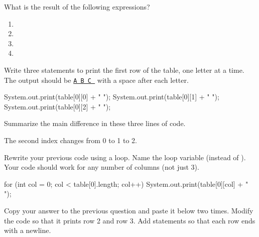 \newpage

\Q What is the result of the following expressions?

\begin{multicols}{2}
\begin{enumerate}
\item {} 
\item {} 
\item {} 
\item {} 
\end{enumerate}
\end{multicols}


\vspace{1em}


\Q Write three statements to print the first row of the table, one letter at a time.
The output should be \underline{\texttt{A~B~C~}} with a space after each letter.

\begin{answer}[5em]
\begin{javaans}
System.out.print(table[0][0] + " ");
System.out.print(table[0][1] + " ");
System.out.print(table[0][2] + " ");
\end{javaans}
\end{answer}


\Q Summarize the main difference in these three lines of code.

\begin{answer}[2em]
The second index changes from 0 to 1 to 2.
\end{answer}


\Q Rewrite your previous code using a  loop.
Name the loop variable  (instead of ).
Your code should work for any number of columns (not just 3).

\begin{answer}[5em]
\begin{javaans}
for (int col = 0; col < table[0].length; col++) {
    System.out.print(table[0][col] + " ");
}
\end{javaans}
\end{answer}


\Q Copy your answer to the previous question and paste it below two times.
Modify the code so that it prints row 2 and row 3.
Add  statements so that each row ends with a newline.

